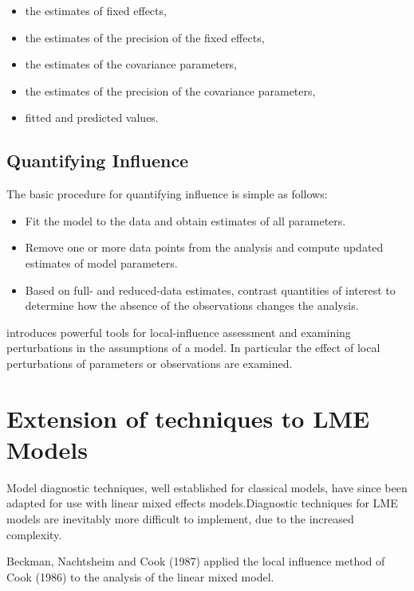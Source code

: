\documentclass[12pt, a4paper]{article}
\begin{document}
	\begin{itemize}
		\item the estimates of fixed effects,
		\item the estimates of the precision of the fixed effects,
		\item the estimates of the covariance parameters,
		\item the estimates of the precision of the covariance parameters,
		\item fitted and predicted values.
	\end{itemize}
	\newpage


	\subsection{Quantifying Influence}  %
	
	The basic procedure for quantifying influence is simple as follows:
	
	\begin{itemize}
		\item Fit the model to the data and obtain estimates of all parameters.
		\item Remove one or more data points from the analysis and compute updated estimates of model parameters.
		\item Based on full- and reduced-data estimates, contrast quantities of interest to determine how the absence of the observations changes the analysis.
	\end{itemize}
	
	\citet{cook86} introduces powerful tools for local-influence assessment and examining perturbations in the assumptions of a model. In particular the effect of local perturbations of parameters or observations are examined.
	
	
	\newpage
	\section{Extension of techniques to LME Models} %
	
	Model diagnostic techniques, well established for classical models, have since been adapted for use with linear mixed effects models.Diagnostic techniques for LME models are inevitably more difficult to implement, due to the increased complexity.
	
	Beckman, Nachtsheim and Cook (1987) \citet{Beckman} applied the local influence method of Cook (1986) to the analysis of the linear mixed model.
	
\end{document}
